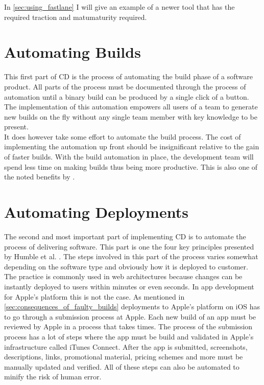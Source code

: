 \documentclass{ituthesis}
\begin{document}
In \autoref{sec:using_fastlane} I will give an example of a newer tool that has the required traction and matumaturity required.

\section{Automating Builds}

This first part of CD is the process of automating the build phase of a software product. All parts of the process must be documented through the process of automation \cite{Osterweil1997} until a binary build can be produced by a single click of a button. The implementation of this automation empowers all users of a team to generate new builds on the fly without any single team member with key knowledge to be present.\\

It does however take some effort to automate the build process. The cost of implementing the automation up front should be insignificant relative to the gain of faster builds. With the build automation in place, the development team will spend less time on making builds thus being more productive. This is also one of the noted benefits by \cite{Chen2015}.

\section{Automating Deployments}

The second and most important part of implementing CD is to automate the process of delivering software. This part is one the four key principles presented by Humble et al. \cite{Humble2006}. The steps involved in this part of the process varies somewhat depending on the software type and obviously how it is deployed to customer.\\

The practice is commonly used in web architectures because changes can be instantly deployed to users within minutes or even seconds. In app development for Apple's platform this is not the case. As mentioned in \autoref{sec:consequences_of_faulty_builds} deployments to Apple's platform on iOS has to go through a submission process at Apple. Each new build of an app must be reviewed by Apple in a process that takes times. The process of the submission process has a lot of steps where the app must be build and validated in Apple's infrastructure called iTunes Connect. After the app is submitted, screenshots, descriptions, links, promotional material, pricing schemes and more must be manually updated and verified. All of these steps can also be automated to minify the risk of human error.\\
\end{document}
